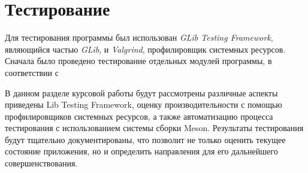 \chapter{Тестирование}

Для тестирования программы был использован \textit{GLib Testing Framework},
являющийся частью \textit{GLib}, и \textit{Valgrind}, профилировщик системных
ресурсов. Сначала было проведено тестирование отдельных модулей программы, в
соответствии с 

В данном разделе курсовой работы будут рассмотрены различные аспекты
приведены Lib Testing Framework, оценку производительности с помощью профилировщиков
системных ресурсов, а также автоматизацию процесса тестирования с использованием
системы сборки Meson. Результаты тестирования будут тщательно документированы,
что позволит не только оценить текущее состояние приложения, но и определить
направления для его дальнейшего совершенствования.
